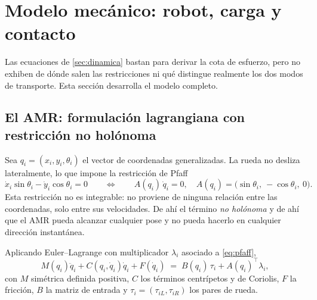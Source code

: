 \section{Modelo mecánico: robot, carga y contacto}
\label{sec:modelo-fisico}

Las ecuaciones de \cref{sec:dinamica} bastan para derivar la cota de esfuerzo,
pero no exhiben de dónde salen las restricciones ni qué distingue realmente los
dos modos de transporte. Esta sección desarrolla el modelo completo.

\subsection{El AMR: formulación lagrangiana con restricción no holónoma}

Sea $q_i=(x_i,y_i,\theta_i)$ el vector de coordenadas generalizadas. La rueda no
desliza lateralmente, lo que impone la restricción de Pfaff
\begin{equation}
  \dot x_i\sin\theta_i-\dot y_i\cos\theta_i=0
  \qquad\Longleftrightarrow\qquad
  A(q_i)\,\dot q_i=0,
  \quad A(q_i)=\bigl(\sin\theta_i,\ -\cos\theta_i,\ 0\bigr).
  \label{eq:pfaff}
\end{equation}
Esta restricción no es integrable: no proviene de ninguna relación entre las
coordenadas, solo entre sus velocidades. De ahí el término \emph{no holónoma} y
de ahí que el AMR pueda alcanzar cualquier pose y no pueda hacerlo en cualquier
dirección instantánea.

Aplicando Euler--Lagrange con multiplicador $\lambda_i$ asociado a
\eqref{eq:pfaff},
\begin{equation}
  M(q_i)\ddot q_i+C(q_i,\dot q_i)\dot q_i+F(\dot q_i)
  \;=\;B(q_i)\,\tau_i+A(q_i)^{\!\top}\lambda_i,
  \label{eq:lagrange}
\end{equation}
con $M$ simétrica definida positiva, $C$ los términos centrípetos y de Coriolis,
$F$ la fricción, $B$ la matriz de entrada y $\tau_i=(\tau_{iL},\tau_{iR})$ los
pares de rueda.

